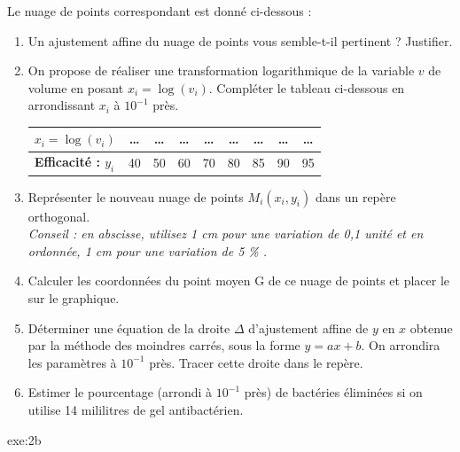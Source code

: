 {Le nuage de points correspondant est donné ci-dessous :
\begin{center}
\end{center}
\begin{enumerate}
\item Un ajustement affine du nuage de points vous semble-t-il pertinent ? Justifier.
\item On propose de réaliser une transformation logarithmique de la variable $v$ de volume en posant $x_i = \log(v_i)$.
Compléter le tableau ci-dessous en arrondissant $x_i$ à $10^{-1}$ près.
 \begin{center}
  \begin{tabular}{|l|*8{c|}}
	 \hline
	 \textbf{$x_i = \log(v_i)$} & \dots & \dots & \dots & \dots & \dots & \dots & \dots & \dots \\
	 \hline
	 \textbf{Efficacité : $y_i$} & 40 & 50 & 60 & 70 & 80 & 85 & 90 & 95 \\
	 \hline
	\end{tabular}
 \end{center}
\item Représenter le nouveau nuage de points $M_i(x_i,y_i)$ dans un repère orthogonal. \\
\textit{Conseil : en abscisse, utilisez 1 cm pour une variation de 0,1 unité et en ordonnée, 1 cm pour une variation de 5 \% .}
\item Calculer les coordonnées du point moyen G de ce nuage de points et placer le sur le graphique.
\item Déterminer une équation de la droite $\Delta$ d'ajustement affine de $y$ en $x$ obtenue par la méthode des moindres carrés,
sous la forme $y=ax+b$. On arrondira les paramètres à $10^{-1}$ près. Tracer cette droite dans le repère.
\item Estimer le pourcentage (arrondi à $10^{-1}$ près) de bactéries éliminées si on utilise 14 mililitres de gel antibactérien.
\end{enumerate}
}{exe:2b}{

}
